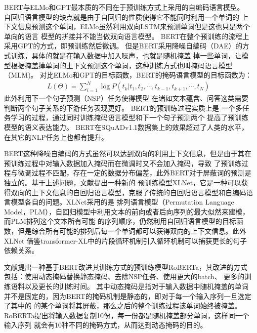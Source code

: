 BERT与ELMo和GPT最本质的不同在于预训练方式上采用的自编码语言模型。
自回归语言模型的缺点就是由于自回归的性质使得它不能同时利用一个单词的
上下文信息预测这个单词，ELMo虽然利用双向LSTM来预测单词但是这也只是两个单向的语言
模型的拼接并不能当做双向语言模型。
BERT在整个预训练的流程上采用GPT的方式，即预训练然后微调。
但是BERT采用降噪自编码（DAE）的方式训练，具体的就是在输入数据中加入噪声，也就是随机掩盖
掉一些单词，让模型根据掩盖掉单词的上下文预测这个单词，这种训练方式也叫掩码语言模型（MLM)。
对比ELMo和GPT的目标函数，BERT的掩码语言模型的目标函数为：
\begin{equation}
    \begin{split}
        L(\Theta)=\sum_{i=1}^{N}\log P(t_k|t_1,t_2,\cdots,t_{k-1},t_{k+1},\cdots,t_{N})
    \end{split}
\end{equation}
此外利用下一个句子预测（NSP）任务使得模型
在诸如文本蕴含、问答这类需要判断两个句子关系的下游任务表现更好。
BERT的预训练过程实质上是
一个多任务学习的过程，通过同时训练掩码语言模型和下一个句子预测两个
提高了预训练模型的语义表达能力。
BERT在SQuADv1.1数据集上的效果超过了人类的水平，在其它的NLP任务上也都有提升。

BERT这种降噪自编码的方式虽然可以达到双向的利用上下文信息，但是由于其在预训练过程中对输入数据加入掩码而在微调时又不会加入掩码，导致
了预训练过程与微调过程不匹配，存在一定的数据分布偏差，此外BERT对于屏蔽词的预测是独立的。基于上述问题，文献\cite{XLNet}提出一种新的
预训练模型XLNet，它是一种可以获得双向的上下文信息的自回归语言模型，克服了传统的自回归语言模型和自编码语言模型各自的问题。XLNet采用的是
排列语言模型（Permutation Language Model，PLM），自回归模型中利用文本的前向或者后向序列的最大似然来建模，而PLM排列这个文本所有可能
的序列顺序，仍然利用自回归语言模型的目标函数，但是综合所有可能的排列后每一个单词都可以获得双向的上下文信息。此外XLNet
借鉴transformer-XL\cite{transformer-XL}中的片段循环机制引入循环机制可以捕获更长的句子依赖关系。

文献\cite{RoBERTa}提出一种基于BERT改进其训练方式的预训练模型RoBERTa，其改进的方式包括：使用动态掩码替换静态掩码、去除NSP任务、使用更大的batch、
更多的训练语料以及更长的训练时间。
其中动态掩码是指对于输入数据中随机掩盖的单词并不是固定的，因为BERT的掩码机制是静态的，即对于每一个输入序列一旦选定了其中的
的某个单词将其屏蔽，那么之后的整个训练过程该单词始终被掩盖。RoBERTa提出将输入数据复制10份，每一份都是随机掩盖部分单词，这样同一个输入序列
就会有10种不同的掩码方式，从而达到动态掩码的目的。







